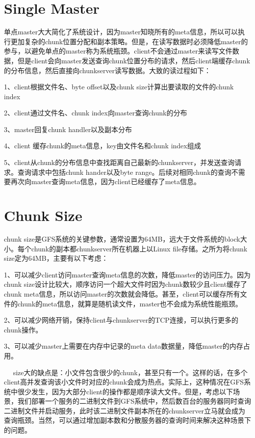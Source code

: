 \documentclass{article}
\begin{document}
\section{Single Master}

单点master大大简化了系统设计，因为master知晓所有的meta信息，所以可以执行更加复杂的chunk位置分配和副本策略。但是，在读写数据时必须降低master的参与，以避免单点的master称为系统瓶颈。client不会通过master来读写文件数据，但是client会向master发送查询chunk位置分布的请求，然后client端缓存chunk的分布信息，然后直接向chunkserver读写数据。大致的读过程如下：

1、client根据文件名、byte offset以及chunk size计算出要读取的文件的chunk index

2、client通过文件名、chunk index向master查询chunk的分布

3、master回复chunk handler以及副本分布

4、client 缓存chunk的meta信息，key由文件名和chunk index组成

5、client从chunk的分布信息中查找距离自己最新的chunkserver，并发送查询请求。查询请求中包括chunk hander以及byte range。后续对相同chunk的查询不需要再次向master查询meta信息，因为client已经缓存了meta信息。

\section{Chunk Size}

chunk size是GFS系统的关键参数，通常设置为64MB，远大于文件系统的block大小。每个chunk的副本都chunkserver所在机器上以Linux file存储。之所为将chunk size定为64MB，主要有以下考虑：

1、可以减少client访问master查询meta信息的次数，降低master的访问压力。因为chunk size设计比较大，顺序访问一个超大文件时因为chunk数较少且client缓存了chunk meta信息，所以访问master的次数就会降低。甚至，client可以缓存所有文件的chunk的meta信息，就算是随机读文件，master也不会成为系统性能瓶颈。

2、可以减少网络开销，保持client与chunkserver的TCP连接，可以执行更多的chunk操作。

3、可以减少master上需要在内存中记录的meta data数据量，降低master的内存占用。

   size大的缺点是：小文件包含很少的chunk，甚至只有一个。这样的话，在多个client高并发查询该小文件时对应的chunk会成为热点。实际上，这种情况在GFS系统中很少发生，因为大部分client的操作都是顺序读大文件。但是，考虑以下场景，我们部署一个服务的二进制文件到GFS系统中，然后数百台的服务器同时查询二进制文件并启动服务，此时该二进制文件副本所在的chunkserver立马就会成为查询瓶颈。当然，可以通过增加副本数和分散服务器的查询时间来解决这种场景下的问题。
\end{document}
